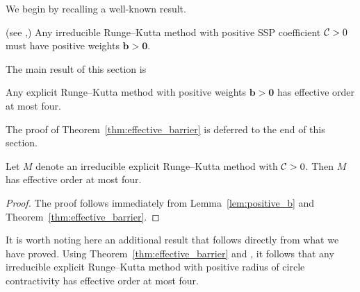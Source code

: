 %
We begin by recalling a well-known result.
\begin{lemma}\label{lem:positive_b}(see \cite[Theorem~4.2]{Kraaijevanger1991},\cite[Lemma 4.2]{Ruuth2002})
	Any irreducible Runge--Kutta method with positive SSP coefficient $\mathcal{C}>0$
	must have positive weights $\bm{b} > \bm{0}$.
\end{lemma}
The main result of this section is
\begin{theorem}\label{thm:effective_barrier}
	Any explicit Runge--Kutta method with positive weights $\bm{b} > \bm{0}$ 
	has effective order at most four.
\end{theorem}
The proof of Theorem~\ref{thm:effective_barrier} is deferred to
the end of this section.
\begin{corollary}\label{cor:no_SSP_5}
    Let $M$ denote an irreducible explicit Runge--Kutta method with $\mathcal{C}>0$.
    Then $M$ has effective order at most four.
\end{corollary}
\begin{proof}
	The proof follows immediately from Lemma~\ref{lem:positive_b} and 
	Theorem~\ref{thm:effective_barrier}.
\end{proof}

\begin{remark}
    It is worth noting here an additional result that 
    follows directly from what we have proved.
    Using Theorem~\ref{thm:effective_barrier} and \cite[Theorem~4.1]{dahlquist2006}, 
    it follows that any irreducible explicit Runge--Kutta method with positive radius of
    circle contractivity has effective order at most four.
\end{remark}

